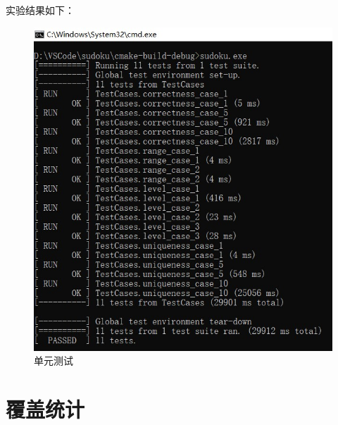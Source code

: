 \documentclass[a4paper]{article}
\begin{document}
实验结果如下：

\begin{figure}[!ht]
  \centering
  \includegraphics[scale=0.9]{images/test.jpg}
  \caption{单元测试}
  \label{fig:test}
\end{figure}


\section{覆盖统计}
\end{document}
